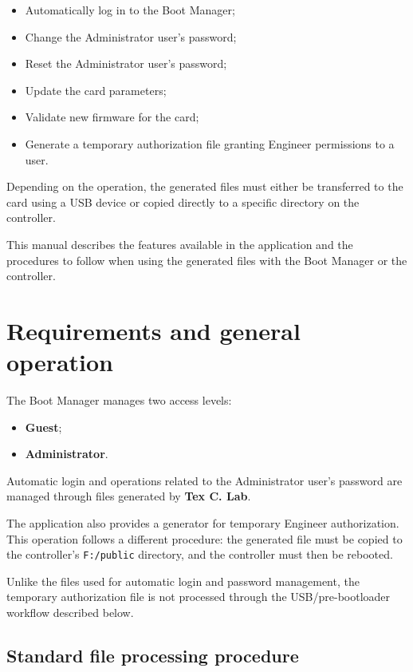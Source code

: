 ﻿\documentclass[11pt,a4paper]{article}
\newcommand{\software}{\textbf{Tex C. Lab}}
\newcommand{\filename}[1]{\texttt{#1}}
\begin{document}
\begin{itemize}
    \item Automatically log in to the Boot Manager;
    \item Change the Administrator user's password;
    \item Reset the Administrator user's password;
    \item Update the card parameters;
    \item Validate new firmware for the card;
    \item Generate a temporary authorization file granting
    Engineer permissions to a user.
\end{itemize}

Depending on the operation, the generated files must either be
transferred to the card using a USB device or copied directly
to a specific directory on the controller.

This manual describes the features available in the application
and the procedures to follow when using the generated files
with the Boot Manager or the controller.

\section{Requirements and general operation}

The Boot Manager manages two access levels:

\begin{itemize}
    \item \textbf{Guest};
    \item \textbf{Administrator}.
\end{itemize}

Automatic login and operations related to the Administrator user's
password are managed through files generated by \software.

The application also provides a generator for temporary Engineer
authorization. This operation follows a different procedure:
the generated file must be copied to the controller's
\filename{F:/public} directory, and the controller must then
be rebooted.

Unlike the files used for automatic login and password management,
the temporary authorization file is not processed through the
USB/pre-bootloader workflow described below.

\subsection{Standard file processing procedure}
\end{document}

